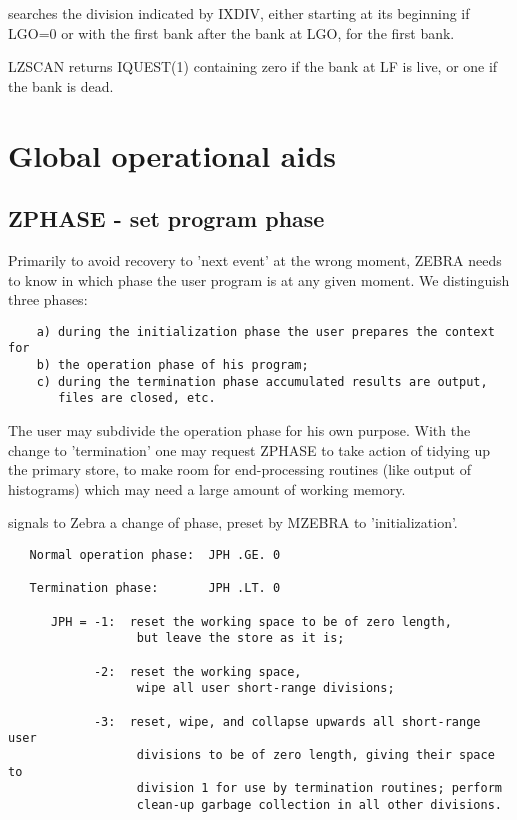 
searches the division indicated by IXDIV, either starting
at its beginning if LGO=0 or with the first bank after the bank
at LGO, for the first bank.

LZSCAN returns IQUEST(1) containing zero if the bank at LF is live,
or one if the bank is dead.
\chapter{Global operational aids}

\section{ZPHASE - set program phase}

Primarily to avoid recovery to 'next event' at the wrong moment,
ZEBRA needs to know in which phase the user program is at any
given moment.
We distinguish three phases:
\begin{verbatim}
    a) during the initialization phase the user prepares the context for
    b) the operation phase of his program;
    c) during the termination phase accumulated results are output,
       files are closed, etc.
\end{verbatim} 
The user may subdivide the operation phase for his own purpose.
With the change to 'termination' one may request ZPHASE to take
action of tidying up the primary store,
to make room for end-processing routines (like output of histograms)
which may need a large amount of working memory.


signals to Zebra a change of phase, preset by MZEBRA to 'initialization'.

\begin{verbatim}
   Normal operation phase:  JPH .GE. 0

   Termination phase:       JPH .LT. 0

      JPH = -1:  reset the working space to be of zero length,
                  but leave the store as it is;

            -2:  reset the working space,
                  wipe all user short-range divisions;

            -3:  reset, wipe, and collapse upwards all short-range user
                  divisions to be of zero length, giving their space to
                  division 1 for use by termination routines; perform
                  clean-up garbage collection in all other divisions.
\end{verbatim} 

